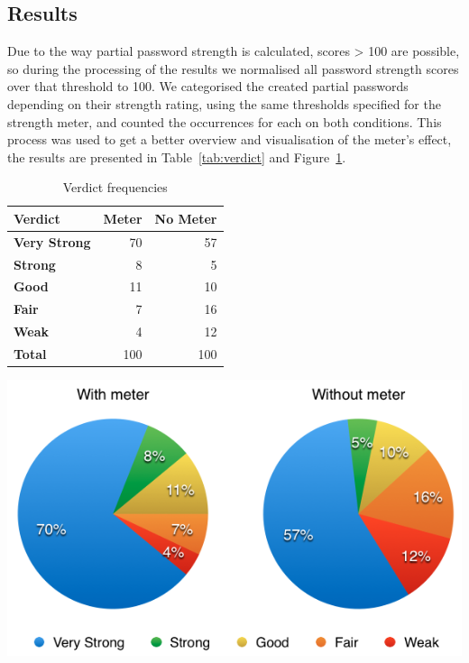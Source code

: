   \subsection{Results}
    \label{ssec:useability_results}
    Due to the way partial password strength is calculated, scores > 100 are possible, so during the processing of the results we normalised all password strength scores over that threshold to 100. We categorised the created partial passwords depending on their strength rating, using the same thresholds specified for the strength meter, and counted the occurrences for each on both conditions. This process was used to get a better overview and visualisation of the meter's effect, the results are presented in Table~\ref{tab:verdict} and Figure~\ref{fig:verdict}.

    \begin{table}[htpb]
      \hspace*{-1.5cm}
      \begin{minipage}[b]{0.3\linewidth}
        \centering
        \scriptsize
        \begin{tabular}{ l r r}
          \toprule
          \textbf{Verdict} & \textbf{Meter} & \textbf{No Meter} \\ \midrule
          \textbf{Very Strong} & 70 & 57 \\
          \textbf{Strong} & 8 & 5 \\
          \textbf{Good} & 11 & 10 \\
          \textbf{Fair} & 7 & 16 \\
          \textbf{Weak} & 4 & 12 \\ \midrule
          \textbf{Total} & 100 & 100 \\ \bottomrule
        \end{tabular}
          \caption{Verdict frequencies}
          \label{tab:verdict}
      \end{minipage}\hfill
      \begin{minipage}[b]{0.7\linewidth}
        \centering
        \includegraphics[width=\linewidth]{Images/results-str}
        \label{fig:verdict}
      \end{minipage}
    \end{table}

